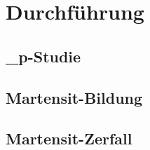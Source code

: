 \chapter{Durchführung}

\section{\alpha_p-Studie}

\section{Martensit-Bildung}

\section{Martensit-Zerfall}